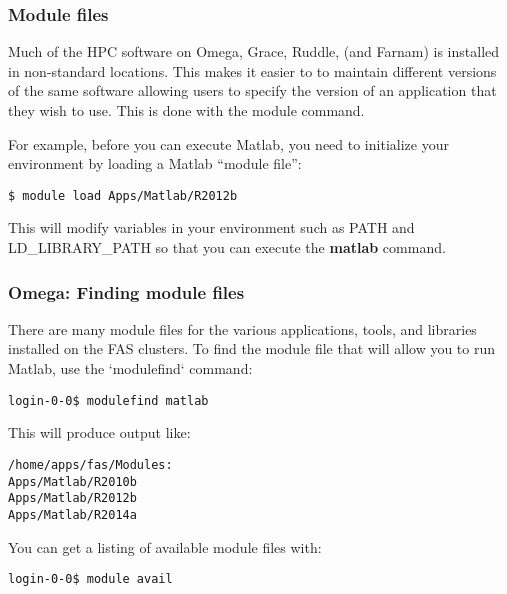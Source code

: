 \documentclass[10pt]{beamer}
\begin{document}
\begin{frame}[fragile]
\frametitle{Module files}
Much of the HPC software on Omega, Grace, Ruddle, (and Farnam) 
is installed in non-standard
locations. This makes it easier to to maintain different versions of the same
software allowing users to specify the version of an application that
they wish to use.  This is done with the module command.

\vskip10pt
For example, before you can execute Matlab, you need to initialize your
environment by loading a Matlab ``module file'':

\begin{verbatim}
$ module load Apps/Matlab/R2012b
\end{verbatim}

This will modify variables in your environment such as PATH and
LD\_LIBRARY\_PATH so that you can execute the \textbf{matlab} command.
\end{frame}

\begin{frame}[fragile]
\frametitle{Omega: Finding module files}
There are many module files for the various applications, tools, and
libraries installed on the FAS clusters.  To find the module file that
will allow you to run Matlab, use the `modulefind` command:

\begin{verbatim}
login-0-0$ modulefind matlab
\end{verbatim}

This will produce output like:

\begin{verbatim}
/home/apps/fas/Modules:
Apps/Matlab/R2010b
Apps/Matlab/R2012b
Apps/Matlab/R2014a
\end{verbatim}

You can get a listing of available module files with:
\begin{verbatim}
login-0-0$ module avail
\end{verbatim}
\end{frame}
\end{document}
